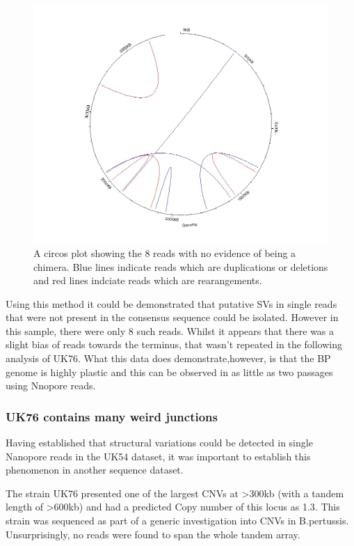 \documentclass{article}
\begin{document}
\begin{figure}[h!]
\centering
\includegraphics[width=\textwidth{}]{Chapter_2/Rplot05.jpeg}
\caption{A circos plot showing the 8 reads with no evidence of being a chimera. Blue lines indicate reads which are duplications or deletions and red lines indciate reads which are rearangements. }
\label{fig:Final_baskey}
\end{figure}

Using this method it could be demonstrated that putative SVs in single reads that were not present in the consensus sequence could be isolated. However in this sample, there were only 8 such reads. Whilst it appears that there was a slight bias of reads towards the terminus, that wasn't repeated in the following analysis of UK76. What this data does demonstrate,however, is that the BP genome is highly plastic and this can be observed in as little as two passages using Nnopore reads.

\subsubsection{UK76 contains many weird junctions}

Having established that structural variations could be detected in single Nanopore reads in the UK54 dataset, it was important to establish this phenomenon in another sequence dataset.

The strain UK76 presented one of the largest CNVs at >300kb (with a tandem length of >600kb) and had a predicted Copy number of this locus as 1.3. This strain was sequenced as part of a generic investigation into CNVs in B.pertussis. Unsurprisingly, no reads were found to span the whole tandem array.
\end{document}
